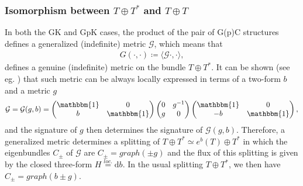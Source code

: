 \documentclass[letterpaper,12pt]{article}
\newcommand{\TT}{{T\oplus T^*}}
\newcommand{\GG}{\mathcal{G}}
\newcommand{\id}{\mathbbm{1}}
\newcommand{\rd}{\mathrm{d}}
\newcommand{\la}{\langle}
\newcommand{\ra}{\rangle}
\theoremstyle{definition}
\theoremstyle{remark}
\theoremstyle{examples}
\begin{document}
\subsubsection{Isomorphism between $\TT$ and $T\oplus T$}\label{sec:isomorphism}
In both the GK and GpK cases, the product of the pair of G(p)C structures defines a generalized (indefinite) metric $\GG$, which means that
\begin{align*}
G(\cdot,\cdot)\coloneqq \la \GG\cdot,\cdot\ra,
\end{align*}
defines a genuine (indefinite) metric on the bundle $\TT$. It can be shown (see eg. \cite{Gualtieri:2003dx,Hu:2019zro}) that such metric can be always locally expressed in terms of a two-form $b$ and a metric $g$
\begin{align}\label{genmetric}
\GG=\GG(g,b)=\begin{pmatrix}
\id & 0 \\
b & \id
\end{pmatrix}
\begin{pmatrix}
0 & g^{-1} \\
g & 0
\end{pmatrix}
\begin{pmatrix}
\id & 0 \\
-b & \id
\end{pmatrix},
\end{align}
and the signature of $g$ then determines the signature of $\GG(g,b)$. Therefore, a generalized metric determines a splitting of $\TT\simeq e^b(T)\oplus T^*$ in which the eigenbundles $C_\pm$ of $\GG$ are $C_\pm=graph(\pm g)$ and the flux of this splitting is given by the closed three-form $H\overset{loc.}{=}\rd b$. In the usual splitting $\TT$, we then have $C_\pm=graph(b\pm g)$.
\end{document}
